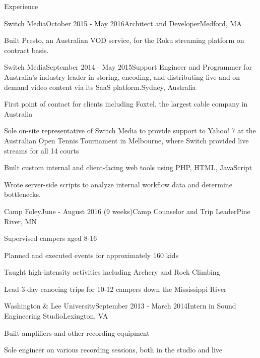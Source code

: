 \documentclass{resume}
\begin{document}
  \begin{rSection}{Experience}
  
    \begin{rSubsection}{Switch Media}{October 2015 - May 2016}{Architect and Developer}{Medford, MA}
    \item Built Presto, an Australian VOD service, for the Roku streaming platform on contract basis.
    \end{rSubsection}

    \begin{rSubsection}{Switch Media}{September 2014 - May 2015}{Support Engineer and Programmer for Australia’s industry leader in storing, encoding, and distributing live and on-demand video content via its SaaS platform.}{Sydney, Australia}
    \item First point of contact for clients including Foxtel, the largest cable company in Australia
    \item Sole on-site representative of Switch Media to provide support to Yahoo! 7 at the Australian Open Tennis Tournament in Melbourne, where Switch provided live streams for all 14 courts
    \item Built custom internal and client-facing web tools using PHP, HTML, JavaScript
    \item Wrote server-side scripts to analyze internal workflow data and determine bottlenecks.
    \end{rSubsection}
  
    \begin{rSubsection}{Camp Foley}{June - August 2016 (9 weeks)}{Camp Counselor and Trip Leader}{Pine River, MN}
    \item Supervised campers aged 8-16
    \item Planned and executed events for approximately 160 kids
    \item Taught high-intensity activities including Archery and Rock Climbing
    \item Lead 3-day canoeing trips for 10-12 campers down the Mississippi River
    \end{rSubsection}

    \begin{rSubsection}{Washington \& Lee University}{September 2013 - March 2014}{Intern in Sound Engineering Studio}{Lexington, VA}
    \item Built amplifiers and other recording equipment
    \item Sole engineer on various recording sessions, both in the studio and live
    \end{rSubsection}
  
  \end{rSection}
  
\end{document}
